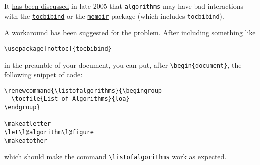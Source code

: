 \documentclass[letterpaper]{article}
\begin{document}
It
\href{http://groups.google.com/group/comp.text.tex/browse_thread/thread/4094e0c4f4fbd83e/a80a3f4666c794f0?fwc=1}{has
  been discussed} in late 2005 that \texttt{algorithms} may have bad
interactions with the
\href{http://www.ctan.org/tex-archive/help/Catalogue/entries/tocbibind.html}{\texttt{tocbibind}}
or the
\href{http://www.ctan.org/tex-archive/help/Catalogue/entries/memoir.html}{\texttt{memoir}}
package (which includes \texttt{tocbibind}).

A workaround has been suggested for the problem. After including
something like
\begin{verbatim}
\usepackage[nottoc]{tocbibind}
\end{verbatim}
in the preamble of your document, you can put, after
\verb+\begin{document}+, the following snippet of code:
\begin{verbatim}
\renewcommand{\listofalgorithms}{\begingroup
  \tocfile{List of Algorithms}{loa}
\endgroup}

\makeatletter
\let\l@algorithm\l@figure
\makeatother
\end{verbatim}
which should make the command \verb+\listofalgorithms+ work as expected.

\end{document}
